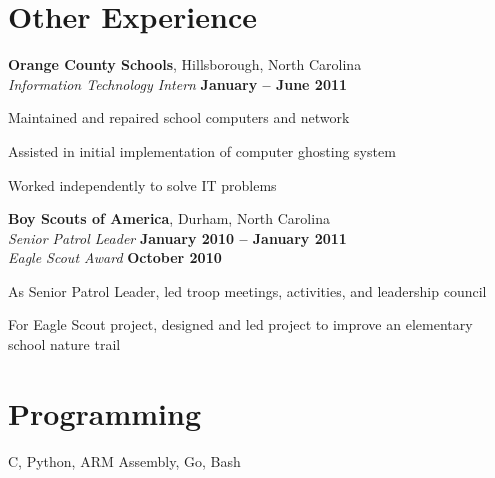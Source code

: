 \documentclass[margin,line,letterpaper]{resume}
\begin{document}
\begin{resume}
    \vspace{2.5mm}
    \section{\mysidestyle Other Experience}

    \textbf{Orange County Schools}, Hillsborough, North Carolina \vspace{1mm}\\\vspace{1mm}%
    \textsl{Information Technology Intern} \hfill \textbf{January -- June 2011}\vspace{-3mm}\\\vspace{-1mm}%
    \begin{list2}
    \item Maintained and repaired school computers and network
    \item Assisted in initial implementation of computer ghosting system
    \item Worked independently to solve IT problems
    \end{list2}\vspace{-1.5mm}

    \textbf{Boy Scouts of America}, Durham, North Carolina \vspace{1mm}\\\vspace{1mm}%
    \textsl{Senior Patrol Leader} \hfill \textbf{January 2010 -- January 2011}\\
    \textsl{Eagle Scout Award} \hfill \textbf{October 2010}\vspace{-3mm}\\
    \begin{list2}
    \item As Senior Patrol Leader, led troop meetings, activities, and leadership council
    \item For Eagle Scout project, designed and led project to improve an elementary school nature trail
    \end{list2}\vspace{-1.5mm}


    \vspace{2.5mm}
    \section{\mysidestyle Programming}
    C, Python, ARM Assembly, Go, Bash
    \vspace{-5mm}


\end{resume}
\end{document}
